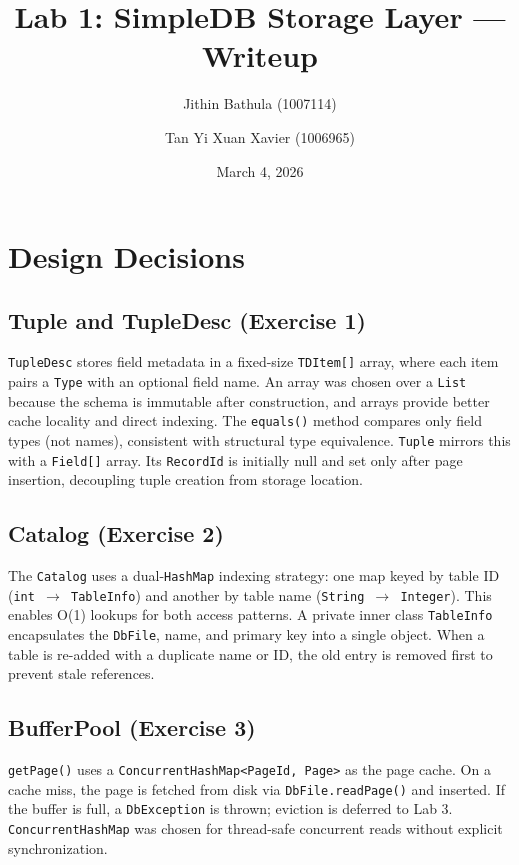 \documentclass[11pt]{article}
\title{\vspace{-1.5em}\textbf{Lab 1: SimpleDB Storage Layer --- Writeup}\vspace{-0.5em}}
\author{Jithin Bathula (1007114) \and Tan Yi Xuan Xavier (1006965)}
\date{March 4, 2026}
\begin{document}
\maketitle
\vspace{-1em}

\section{Design Decisions}

\subsection{Tuple and TupleDesc (Exercise 1)}
\texttt{TupleDesc} stores field metadata in a fixed-size \texttt{TDItem[]} array, where each item pairs a \texttt{Type} with an optional field name. An array was chosen over a \texttt{List} because the schema is immutable after construction, and arrays provide better cache locality and direct indexing. The \texttt{equals()} method compares only field types (not names), consistent with structural type equivalence. \texttt{Tuple} mirrors this with a \texttt{Field[]} array. Its \texttt{RecordId} is initially null and set only after page insertion, decoupling tuple creation from storage location.

\subsection{Catalog (Exercise 2)}
The \texttt{Catalog} uses a dual-\texttt{HashMap} indexing strategy: one map keyed by table ID (\texttt{int $\to$ TableInfo}) and another by table name (\texttt{String $\to$ Integer}). This enables O(1) lookups for both access patterns. A private inner class \texttt{TableInfo} encapsulates the \texttt{DbFile}, name, and primary key into a single object. When a table is re-added with a duplicate name or ID, the old entry is removed first to prevent stale references.

\subsection{BufferPool (Exercise 3)}
\texttt{getPage()} uses a \texttt{ConcurrentHashMap<PageId, Page>} as the page cache. On a cache miss, the page is fetched from disk via \texttt{DbFile.readPage()} and inserted. If the buffer is full, a \texttt{DbException} is thrown; eviction is deferred to Lab 3. \texttt{ConcurrentHashMap} was chosen for thread-safe concurrent reads without explicit synchronization.
\end{document}
